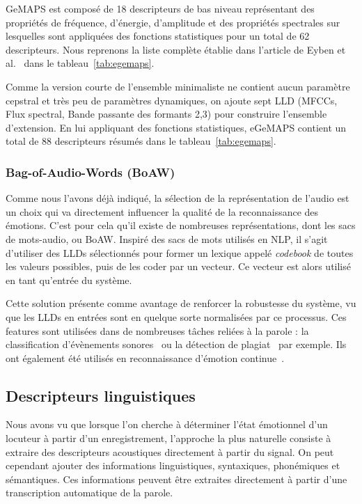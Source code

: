 GeMAPS est composé de 18 descripteurs de bas niveau représentant des propriétés de fréquence, d’énergie, d’amplitude et des propriétés spectrales sur lesquelles sont appliquées des fonctions statistiques pour un total de 62 descripteurs.
Nous reprenons la liste complète établie dans l'article de Eyben et al.~\cite{Eyben2016} dans le tableau~\ref{tab:egemaps}.



Comme la version courte de l’ensemble minimaliste ne contient aucun paramètre cepstral et très peu de paramètres dynamiques, on ajoute sept LLD (MFCCs, Flux spectral, Bande passante des formants 2,3) pour construire l'ensemble d'extension. En lui appliquant des fonctions statistiques, eGeMAPS contient un total de 88 descripteurs résumés dans le tableau~\ref{tab:egemaps}.

\subsubsection{Bag-of-Audio-Words (BoAW)}
Comme nous l'avons déjà indiqué, la sélection de la représentation de l'audio est un choix qui va directement influencer la qualité de la reconnaissance des émotions. C'est pour cela qu'il existe de nombreuses représentations, dont les sacs de mots-audio, ou BoAW. Inspiré des sacs de mots utilisés en NLP, il s'agit d'utiliser des LLDs sélectionnés pour former un lexique appelé \textit{codebook} de toutes les valeurs possibles, puis de les coder par un vecteur. Ce vecteur est alors utilisé en tant qu'entrée du système.

Cette solution présente comme avantage de renforcer la robustesse du système, vu que les LLDs en entrées sont en quelque sorte normalisées par ce processus. Ces features sont utilisées dans de nombreuses tâches reliées à la parole : la classification d'évènements sonores~\cite{Pancoast2012,Schmitt2016} ou la détection de plagiat~\cite{Liu2010} par exemple. Ils ont également été utilisés en reconnaissance d'émotion continue~\cite{Schmitt2016,Han2018}. %

\subsection{Descripteurs linguistiques}
Nous avons vu que lorsque l'on cherche à déterminer l'état émotionnel d'un locuteur à partir d'un enregistrement, l'approche la plus naturelle consiste à extraire des descripteurs acoustiques directement à partir du signal. On peut cependant ajouter des informations linguistiques, syntaxiques, phonémiques et sémantiques. Ces informations peuvent être extraites directement à partir d'une transcription automatique de la parole.


